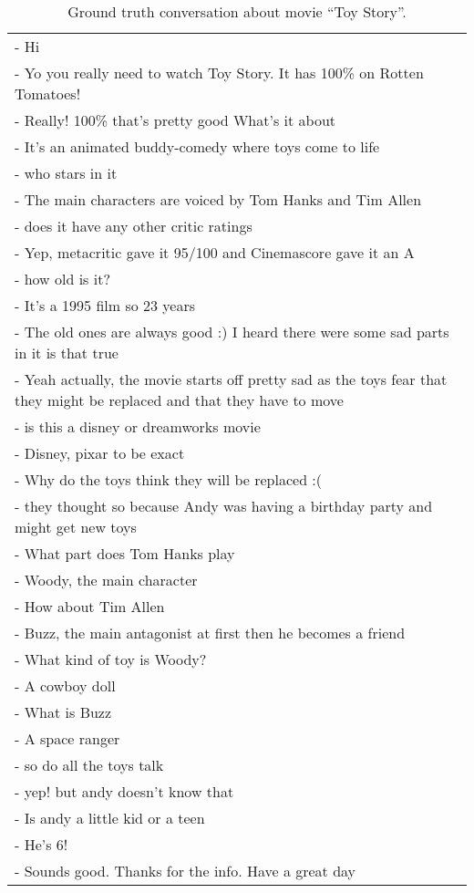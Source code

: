 \documentclass[11pt]{article}
\begin{document}
\begin{table*}[h]
    \centering
    \small
    \begin{tabular}{p{\textwidth}}
    \toprule
        - Hi \\
        - Yo you really need to watch Toy Story. It has 100\% on Rotten Tomatoes! \\
        - Really! 100\% that's pretty good What's it about \\
        - It's an animated buddy-comedy where toys come to life \\
        - who stars in it \\
        - The main characters are voiced by Tom Hanks and Tim Allen \\
        - does it have any other critic ratings \\
        - Yep, metacritic gave it 95/100 and Cinemascore gave it an A \\
        - how old is it? \\
        - It's a 1995 film so 23 years \\
        - The old ones are always good :) I heard there were some sad parts in it is that true \\
        - Yeah actually, the movie starts off pretty sad as the toys fear that they might be replaced and that they have to move \\
        - is this a disney or dreamworks movie \\
        - Disney, pixar to be exact \\
        - Why do the toys think they will be replaced :( \\
        - they thought so because Andy was having a birthday party and might get new toys \\
        - What part does Tom Hanks play \\
        - Woody, the main character \\
        - How about Tim Allen \\
        - Buzz, the main antagonist at first then he becomes a friend \\
        - What kind of toy is Woody? \\
        - A cowboy doll \\
        - What is Buzz \\
        - A space ranger \\
        - so do all the toys talk \\
        - yep! but andy doesn't know that \\
        - Is andy a little kid or a teen \\
        - He's 6! \\
        - Sounds good. Thanks for the info. Have a great day \\
    \bottomrule
    \end{tabular}
    \caption{Ground truth conversation about movie ``Toy Story''.}
    \label{tab:dialogue_toystory}
\end{table*}
\end{document}
